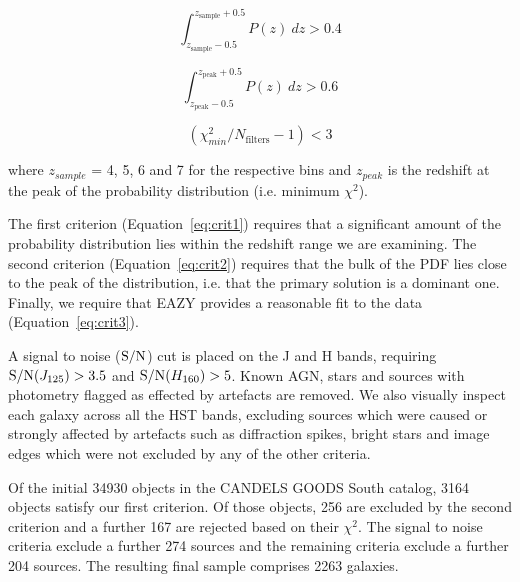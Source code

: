 
\begin{equation}\label{eq:crit1}
\int_{z_{\text{sample}}-0.5}^{z_{\text{sample}}+0.5} P(z)~dz > 0.4
\end{equation}

\begin{equation}\label{eq:crit2}
\int_{z_{\text{peak}}-0.5}^{z_{\text{peak}}+0.5} P(z)~dz > 0.6
\end{equation}
 
\begin{equation}\label{eq:crit3}
(\chi^{2}_{min} /N_{\text{filters}}-1) < 3
\end{equation}

\noindent where $z_{sample}$ = 4, 5, 6 and 7 for the respective bins and $z_{peak}$ is the redshift at the peak of the probability distribution (i.e. minimum $\chi^2$). 

The first criterion (Equation~\ref{eq:crit1}) requires that a significant amount of the probability distribution lies within the redshift range we are examining. The second criterion (Equation~\ref{eq:crit2}) requires that the bulk of the PDF lies close to the peak of the distribution, i.e. that the primary solution is a dominant one. Finally, we require that EAZY provides a reasonable fit to the data (Equation~\ref{eq:crit3}). 

A signal to noise ($\textup{S/N}$) cut is placed on the J and H bands, requiring $\textup{S/N}(J_{125}) > 3.5$ and $\textup{S/N}(H_{160}) > 5$. Known AGN, stars and sources with photometry flagged as effected by artefacts are removed. We also visually inspect each galaxy across all the HST bands, excluding sources which were caused or strongly affected by artefacts such as diffraction spikes, bright stars and image edges which were not excluded by any of the other criteria. 

Of the initial 34930 objects in the CANDELS GOODS South catalog, 3164 objects satisfy our first criterion. Of those objects, 256 are excluded by the second criterion and a further 167 are rejected based on their $\chi^{2}$. The signal to noise criteria exclude a further 274 sources and the remaining criteria exclude a further 204 sources. The resulting final sample comprises 2263 galaxies.

